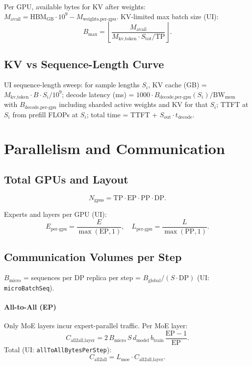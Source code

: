 \documentclass[11pt]{article}
\begin{document}
Per GPU, available bytes for KV after weights: $M_{\text{avail}} = \text{HBM}_{\text{GB}} \cdot 10^9 - M_{\text{weights,per-gpu}}$. KV-limited max batch size (UI):
\[
B_{\max} = \left\lfloor \frac{M_{\text{avail}}}{M_{\text{kv,token}} \cdot S_{\text{tot}} / \mathrm{TP}} \right\rfloor.
\]

\subsection{KV vs Sequence-Length Curve}

UI sequence-length sweep: for sample lengths $S_i$, KV cache (GB) = $M_{\text{kv,token}} \cdot B \cdot S_i / 10^9$; decode latency (ms) = $1000 \cdot B_{\text{decode,per-gpu}}(S_i) / \mathrm{BW}_{\text{mem}}$ with $B_{\text{decode,per-gpu}}$ including sharded active weights and KV for that $S_i$; TTFT at $S_i$ from prefill FLOPs at $S_i$; total time = TTFT + $S_{\text{out}} \cdot t_{\text{decode}}$.

\section{Parallelism and Communication}

\subsection{Total GPUs and Layout}

\[
N_{\text{gpus}} = \mathrm{TP} \cdot \mathrm{EP} \cdot \mathrm{PP} \cdot \mathrm{DP}.
\]

Experts and layers per GPU (UI):
\[
E_{\text{per-gpu}} = \frac{E}{\max(\mathrm{EP}, 1)},
\quad
L_{\text{per-gpu}} = \frac{L}{\max(\mathrm{PP}, 1)}.
\]

\subsection{Communication Volumes per Step}

$B_{\text{micro}}$ = sequences per DP replica per step = $B_{\text{global}} / (S \cdot \mathrm{DP})$ (UI: \texttt{microBatchSeq}).

\paragraph{All-to-All (EP)}
Only MoE layers incur expert-parallel traffic. Per MoE layer:
\[
C_{\text{all2all,layer}} =
2 \, B_{\text{micro}} \, S \, d_{\text{model}} \, b_{\text{train}}
\,\frac{\mathrm{EP}-1}{\mathrm{EP}}.
\]
Total (UI: \texttt{allToAllBytesPerStep}):
\[
C_{\text{all2all}} = L_{\text{moe}} \cdot C_{\text{all2all,layer}}.
\]
\end{document}
